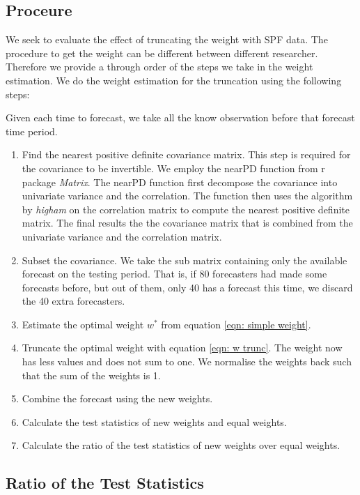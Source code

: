 \documentclass[11pt]{article}
\begin{document}
\subsection{Proceure}\label{proceure}

We seek to evaluate the effect of truncating the weight with SPF data.
The procedure to get the weight can be different between different
researcher. Therefore we provide a through order of the steps we take in
the weight estimation. We do the weight estimation for the truncation
using the following steps:

Given each time to forecast, we take all the know observation before
that forecast time period.

\begin{enumerate}
\def\labelenumi{\arabic{enumi}.}
\item
Find the nearest positive definite covariance matrix. This step is
required for the covariance to be invertible. We employ the nearPD
function from r package \emph{Matrix}. The nearPD function first
decompose the covariance into univariate variance and the correlation.
The function then uses the algorithm by \emph{higham} on the
correlation matrix to compute the nearest positive definite matrix.
The final results the the covariance matrix that is combined from the
univariate variance and the correlation matrix.
\item
Subset the covariance. We take the sub matrix containing only the available forecast on the
testing period. That is, if 80 forecasters had made some forecasts
before, but out of them, only 40 has a forecast this time, we discard
the 40 extra forecasters.
\item
Estimate the optimal weight \(w^*\) from equation
\ref{eqn: simple weight}.
\item
Truncate the optimal weight with equation \ref{eqn: w trunc}. The weight now
has less values and does not sum to one. We normalise the weights back such that the sum of the weights is 1.
\item
Combine the forecast using the new weights.
\item
Calculate the test statistics of new weights and equal weights.
\item
Calculate the ratio of the test statistics of new weights over equal weights.
\end{enumerate}

\subsection{Ratio of the Test Statistics}\label{ratio-of-mean-squared-prediction-error}
\end{document}
